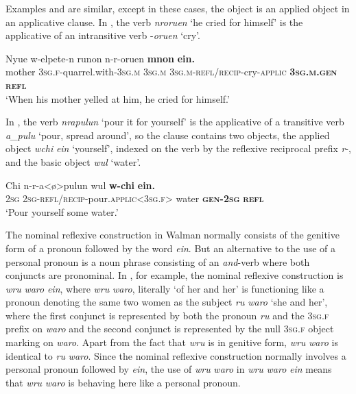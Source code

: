 \documentclass[output=paper]{langscibook}
\begin{document}
Examples  and  are similar, except in these cases, the object is an applied object in an applicative clause. In , the verb \emph{nroruen} ‘he cried for himself’ is the applicative of an intransitive verb -\emph{oruen} ‘cry’.


\ea%
    \label{ex:Brown:48}
    \gll Nyue  w-elpete-n  runon  n-r-oruen \textbf{mnon}  \textbf{ein.}\\
 mother  \textsc{3sg.f}{}-quarrel.with-\textsc{3sg.m}  \textsc{3sg.m}  \textsc{3sg.m}{}-\textsc{refl/recip}{}-cry-\textsc{applic} \textbf{\textsc{3sg.m.gen}}  \textbf{\textsc{refl}}\\
    \glt ‘When his mother yelled at him, he cried for himself.’
    \z

In , the verb \emph{nrapulun} ‘pour it for yourself’ is the applicative of a transitive verb \emph{a\_pulu} ‘pour, spread around’, so the clause contains two objects, the applied object \emph{wchi} \emph{ein} ‘yourself’, indexed on the verb by the reflexive reciprocal prefix \emph{r}{}-, and the basic object \emph{wul} ‘water’.
 

\ea%
    \label{ex:Brown:49}
    \gll Chi  n-r-a<ø>pulun  wul  \textbf{w-chi}  \textbf{ein.}\\
 \textsc{2sg}  \textsc{2sg-refl/recip}{}-pour.\textsc{applic<3sg.f>}  water  \textbf{\textsc{gen}}\textbf{{}-}\textbf{\textsc{2sg}}  \textbf{\textsc{refl}} \\
    \glt  ‘Pour yourself some water.’
    \z

  The nominal reflexive construction in Walman normally consists of the genitive form of a pronoun followed by the word \emph{ein}. But an alternative to the use of a personal pronoun is a noun phrase consisting of an \emph{and}{}-verb where both conjuncts are pronominal. In , for example, the nominal reflexive construction is \emph{wru} \emph{waro} \emph{ein}, where \emph{wru} \emph{waro}, literally ‘of her and her’ is functioning like a pronoun denoting the same two women as the subject \emph{ru} \emph{waro} ‘she and her’, where the first conjunct is represented by both the pronoun \emph{ru} and the \textsc{3sg.f} prefix on \emph{waro} and the second conjunct is represented by the null \textsc{3sg.f} object marking on \emph{waro}. Apart from the fact that \emph{wru} is in genitive form, \emph{wru} \emph{waro} is identical to \emph{ru} \emph{waro}. Since the nominal reflexive construction normally involves a personal pronoun followed by \emph{ein}, the use of \emph{wru} \emph{waro} in \emph{wru} \emph{waro} \emph{ein} means that \emph{wru} \emph{waro} is behaving here like a personal pronoun.
\end{document}
